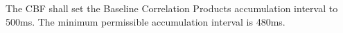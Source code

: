 The CBF shall set the Baseline Correlation Products accumulation interval to
500ms. The minimum permissible accumulation interval is 480ms.
